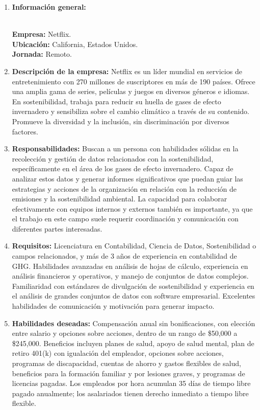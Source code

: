 \documentclass[12pt]{article}
\begin{document}
                \begin{enumerate}
                    \item \textbf{Información general:}
                    
                        \textbf{\\Empresa:} Netflix.
                        \textbf{\\Ubicación:} California, Estados Unidos.
                        \textbf{\\Jornada:} Remoto.

                    \item \textbf{Descripción de la empresa:}
                        Netflix es un líder mundial en servicios de entretenimiento con 270 millones de suscriptores en más de 190 países. Ofrece una amplia gama de series, películas y juegos en diversos géneros e idiomas. En sostenibilidad, trabaja para reducir su huella de gases de efecto invernadero y sensibiliza sobre el cambio climático a través de su contenido. Promueve la diversidad y la inclusión, sin discriminación por diversos factores.

                    \item \textbf{Responsabilidades:}
                        Buscan a un persona con habilidades sólidas en la recolección y gestión de datos relacionados con la sostenibilidad, específicamente en el área de los gases de efecto invernadero. Capaz de analizar estos datos y generar informes significativos que puedan guiar las estrategias y acciones de la organización en relación con la reducción de emisiones y la sostenibilidad ambiental. La capacidad para colaborar efectivamente con equipos internos y externos también es importante, ya que el trabajo en este campo suele requerir coordinación y comunicación con diferentes partes interesadas.

                    \item \textbf{Requisitos:}
                        Licenciatura en Contabilidad, Ciencia de Datos, Sostenibilidad o campos relacionados, y más de 3 años de experiencia en contabilidad de GHG. Habilidades avanzadas en análisis de hojas de cálculo, experiencia en análisis financieros y operativos, y manejo de conjuntos de datos complejos. Familiaridad con estándares de divulgación de sostenibilidad y experiencia en el análisis de grandes conjuntos de datos con software empresarial. Excelentes habilidades de comunicación y motivación para generar impacto.

                    \item \textbf{Habilidades deseadas:}
                        Compensación anual sin bonificaciones, con elección entre salario y opciones sobre acciones, dentro de un rango de \$50,000 a \$245,000. Beneficios incluyen planes de salud, apoyo de salud mental, plan de retiro 401(k) con igualación del empleador, opciones sobre acciones, programas de discapacidad, cuentas de ahorro y gastos flexibles de salud, beneficios para la formación familiar y por lesiones graves, y programas de licencias pagadas. Los empleados por hora acumulan 35 días de tiempo libre pagado anualmente; los asalariados tienen derecho inmediato a tiempo libre flexible.


\end{enumerate}
\end{document}
